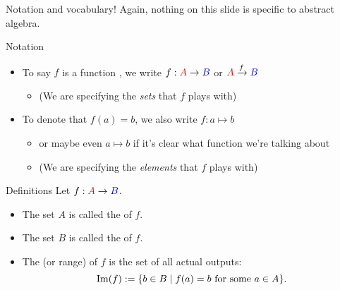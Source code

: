\documentclass[8pt, handout]{beamer}
\begin{document}

\begin{frame}{Notation and vocabulary!}
  Again, nothing on this slide is specific to abstract algebra. \pause
  \begin{exampleblock}{Notation}
    \begin{itemize}
      \item To say $f$ is a function  , we write $f:\Alert{A} \to \Balert{B}$ or $\Alert{A} \xrightarrow{f} \Balert{B}$ \pause
      \begin{itemize}
        \item (We are specifying the \emph{sets} that $f$ plays with) \pause
      \end{itemize}
      \item To denote that $f(a) = b$, we also write $f: a\mapsto b$  \pause
      \begin{itemize}
        \item or maybe even $a \mapsto b$ if it's clear what function we're talking about
        \item (We are specifying the \emph{elements} that $f$ plays with)
      \end{itemize}
    \end{itemize}
  \end{exampleblock}

  \begin{block}{Definitions}
    Let $f:\Alert{A} \to \Balert{B}$.
    \begin{itemize}
      \item The set $A$ is called the  of $f$. \pause
      \item The set $B$ is called the  of $f$. \pause
      \item The  (or range) of $f$ is the set of all actual outputs:
      \[\operatorname{Im}(f) := \{b\in B \mid f(a) = b \text{ for some } a\in A\}.\]
    \end{itemize}
  \end{block}
\end{frame}

\end{document}
